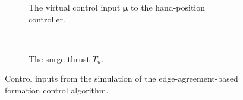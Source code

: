 \begin{figure}[htbp]
    \centering
    \begin{subfigure}[t]{.9\textwidth}
    \centering
    \setlength{}
    \setlength\figureheight{3 cm}
    
    \vspace*{-2mm}
    \caption{The virtual control input $\bm{\mu}$ to the hand-position controller.}
    \label{fig:restrepo_norm_mu}
    \end{subfigure}
    \\
    \begin{subfigure}[t]{.9\textwidth}
    \centering
    \setlength{}
    \setlength\figureheight{3cm}
    
    \vspace*{-2mm}
    \caption{The surge thrust $T_u$.}
    \label{fig:restrepo_surge_thrust}
    \end{subfigure}
    \vspace*{-2mm}
    \caption{Control inputs from the simulation of the edge-agreement-based formation control algorithm.}
    \label{fig:control_input_restrepo}
\end{figure}
